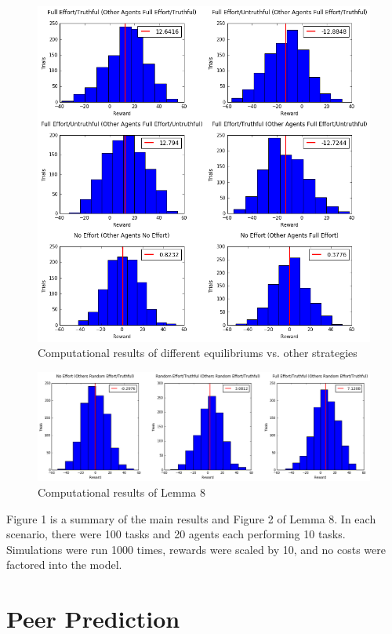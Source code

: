\documentclass{scrartcl}
\begin{document}
\begin{figure}[H]
	\caption{Computational results of different equilibriums vs. other strategies}
	\centering
	\includegraphics[width=1.0\textwidth]{cs_equilibriums}
\end{figure}
\begin{figure}[H]
	\caption{Computational results of Lemma 8}
	\centering
	\includegraphics[width=1.0\textwidth]{cs_lemma8}
\end{figure}

Figure 1 is a summary of the main results and Figure 2 of Lemma 8. In each scenario, there were 100 tasks and 20 agents each performing 10 tasks. Simulations were run 1000 times, rewards were scaled by 10, and no costs were factored into the model. 

\section{Peer Prediction}
\end{document}
